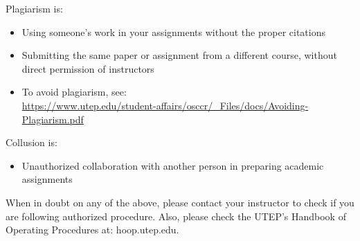 Plagiarism is:
\begin{itemize}
\item Using someone’s work in your assignments without the proper citations
\item Submitting the same paper or assignment from a different course, without direct permission of instructors
\item[]\vspace{1em} To avoid plagiarism, see: \\{\footnotesize\url{https://www.utep.edu/student-affairs/osccr/_Files/docs/Avoiding-Plagiarism.pdf}}
\end{itemize}
                               
Collusion is:
\begin{itemize}
\item Unauthorized collaboration with another person in preparing academic assignments
\end{itemize}

\begin{tcolorbox}[colback=red!5,colframe=red!75!black,title=Important!]
When in doubt on any of the above, please contact your instructor to check if you are following authorized procedure. Also, please check the UTEP’s Handbook of Operating Procedures at: hoop.utep.edu. 
\end{tcolorbox}

